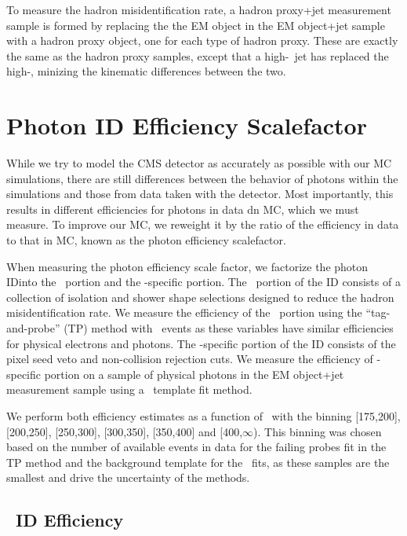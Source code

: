 To measure the hadron misidentification rate, a hadron proxy+jet measurement sample is formed by replacing the the EM object in the EM object+jet sample with a hadron proxy object, one for each type of hadron proxy.
These are exactly the same as the hadron proxy samples, except that a high-\pt\ jet has replaced the high-\met, minizing the kinematic differences between the two.

\section{Photon ID Efficiency Scalefactor}
\label{sec:photoneff}

While we try to model the CMS detector as accurately as possible with our MC simulations, there are still differences between the behavior of photons within the simulations and those from data taken with the detector.
Most importantly, this results in different efficiencies for photons in data dn MC, which we must measure.
To improve our MC, we reweight it by the ratio of the efficiency in data to that in MC, known as the photon efficiency scalefactor.

When measuring the photon efficiency scale factor, we factorize the photon IDinto the \egamma\ portion and the \Pgg-specific portion. 
The \egamma\ portion of the ID consists of a collection of isolation and shower shape selections designed to reduce the hadron misidentification rate.
We measure the efficiency of the \egamma\ portion  using the ``tag-and-probe'' (TP) method with \Zee\ events as these variables have similar efficiencies for physical electrons and photons. 
The \Pgg-specific portion of the ID consists of the pixel seed veto and non-collision rejection cuts.
We measure the efficiency of \Pgg-specific portion on a sample of physical photons in the EM object+jet measurement sample using a \sieie\ template fit method.

We perform both efficiency estimates as a function of \pt\ with the binning [175,200], [200,250], [250,300], [300,350], [350,400] and [400,$\infty$). 
This binning was chosen based on the number of available events in data for the failing probes fit in the TP method and the background template for the \sieie\ fits, as these samples are the smallest and drive the uncertainty of the methods.

\subsection{\egamma\ ID Efficiency}
\label{sec:idsf}

